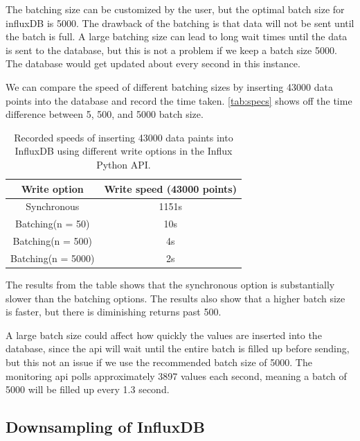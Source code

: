 \documentclass[main.tex]{subfiles}
\begin{document}
The batching size can be customized by the user, but the optimal batch size for influxDB is 5000\cite{influx_batching}. The drawback of the batching is that data will not be sent until the batch is full. A large batching size can lead to long wait times until the data is sent to the database, but this is not a problem if we keep a batch size 5000. The database would get updated about every second in this instance.

We can compare the speed of different batching sizes by inserting 43000 data points into the database and record the time taken. \autoref{tab:specs} shows off the time difference between 5, 500, and 5000 batch size.
\begin{table}[h]
\centering
\begin{tabular}{||c c||} 
 \hline
 Write option & Write speed (43000 points)\\ [0.5ex] 
 \hline\hline
 Synchronous & 1151s \\ 
 \hline
 Batching(n = 50) & 10s  \\
 \hline
 Batching(n = 500) & 4s \\
 \hline
 Batching(n = 5000) & 2s\\ [1ex]
\hline

\end{tabular}
\caption{\label{tab:specs} Recorded speeds of inserting 43000 data paints into InfluxDB using different write options in the Influx Python API.}
\end{table}
\FloatBarrier

The results from the table shows that the synchronous option is substantially slower than the batching options. The results also show that a higher batch size is faster, but there is diminishing returns past 500. 

A large batch size could affect how quickly the values are inserted into the database, since the \gls{api} will wait until the entire batch is filled up before sending, but this not an issue if we use the recommended batch size of 5000. The monitoring \gls{api} polls approximately 3897 values each second, meaning a batch of 5000 will be filled up every 1.3 second.

 
 
 \subsection{Downsampling of InfluxDB}
 \label{ssec: downsampling}
\end{document}
